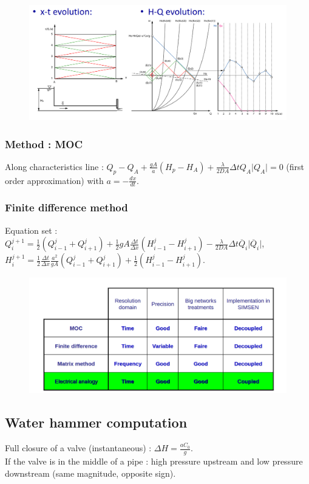 \documentclass[../main.tex]{subfiles}
\begin{document}
\begin{figure}[hbt!]
    \centering
    \includegraphics[width=0.5\linewidth]{IMAGES/Hydraulic/Screenshot from 2025-03-14 10-25-28.png}
\end{figure}

\subsubsection{Method : MOC}
Along characteristics line : $Q_p - Q_A + \frac{gA}{a} (H_p-H_A) + \frac{\lambda}{2DA} \Delta t Q_A \lvert Q_A \rvert = 0$ (first order approximation) with $a=-\frac{dx}{dt}$.\\

\subsubsection{Finite difference method}
Equation set : $Q_i^{j+1} = \frac{1}{2} (Q_{i-1}^j  + Q_{i+1}^j) + \frac{1}{2} gA \frac{\Delta t}{\Delta x} (H_{i-1}^j - H_{i+1}^j) - \frac{\lambda }{2DA} \Delta t \overline{ Q}_i \lvert \overline{Q}_i \rvert$, $H_i^{j+1} = \frac{1}{2} \frac{\Delta t}{\Delta x} \frac{a^2}{gA} (Q_{i-1}^j  + Q_{i+1}^j) + \frac{1}{2} (H_{i-1}^j - H_{i+1}^j)$.\\


\begin{figure}[hbt!]
    \centering
    \includegraphics[width=0.5\linewidth]{IMAGES/Hydraulic/Screenshot from 2025-03-14 10-32-40.png}
\end{figure}

\subsection{Water hammer computation}
Full closure of a valve (instantaneous) : $\Delta H = \frac{aC_0}{g}$.\\
If the valve is in the middle of a pipe : high pressure upstream and low pressure downstream (same magnitude, opposite sign). \\
\end{document}

